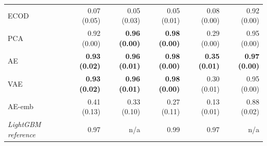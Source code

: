 \begin{table}[tbp]
\begin{tabular}{@{}lrrrrr@{}}
ECOD & 0.07 (0.05) & 0.05 (0.03) & 0.05 (0.01) & 0.08 (0.00) & 0.92 (0.00) \\
PCA & 0.92 (0.00) & \textbf{0.96 (0.00)} & \textbf{0.98 (0.00)} & 0.29 (0.00) & 0.95 (0.00) \\
AE & \textbf{0.93 (0.02)} & \textbf{0.96 (0.01)} & \textbf{0.98 (0.00)} & \textbf{0.35 (0.01)} & \textbf{0.97 (0.00)} \\
VAE & \textbf{0.93 (0.02)} & \textbf{0.96 (0.01)} & \textbf{0.98 (0.00)} & 0.30 (0.01) & 0.95 (0.00) \\
AE-emb & 0.41 (0.13) & 0.33 (0.10) & 0.27 (0.11) & 0.13 (0.01) & 0.88 (0.02) \\
\textit{LightGBM reference} & 0.97 & n/a & 0.99 & 0.97 & n/a \\
\bottomrule
\end{tabular}
\end{table}
